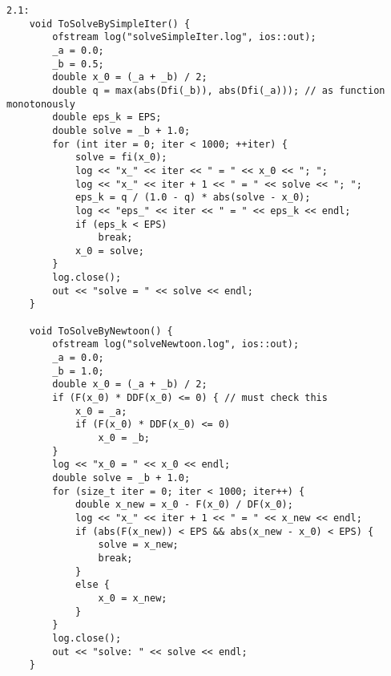 \begin{lstlisting}
2.1:
    void ToSolveBySimpleIter() {
        ofstream log("solveSimpleIter.log", ios::out);
        _a = 0.0;
        _b = 0.5;
        double x_0 = (_a + _b) / 2; 
        double q = max(abs(Dfi(_b)), abs(Dfi(_a))); // as function monotonously
        double eps_k = EPS;
        double solve = _b + 1.0;
        for (int iter = 0; iter < 1000; ++iter) {
            solve = fi(x_0);
            log << "x_" << iter << " = " << x_0 << "; ";
            log << "x_" << iter + 1 << " = " << solve << "; ";
            eps_k = q / (1.0 - q) * abs(solve - x_0);
            log << "eps_" << iter << " = " << eps_k << endl;
            if (eps_k < EPS)
                break;
            x_0 = solve;
        }
        log.close();
        out << "solve = " << solve << endl;
    }

    void ToSolveByNewtoon() {
        ofstream log("solveNewtoon.log", ios::out);
        _a = 0.0;
        _b = 1.0;
        double x_0 = (_a + _b) / 2;
        if (F(x_0) * DDF(x_0) <= 0) { // must check this 
            x_0 = _a;
            if (F(x_0) * DDF(x_0) <= 0)
                x_0 = _b;
        }
        log << "x_0 = " << x_0 << endl;
        double solve = _b + 1.0;
        for (size_t iter = 0; iter < 1000; iter++) {
            double x_new = x_0 - F(x_0) / DF(x_0);
            log << "x_" << iter + 1 << " = " << x_new << endl;
            if (abs(F(x_new)) < EPS && abs(x_new - x_0) < EPS) {
                solve = x_new;
                break;
            }
            else {
                x_0 = x_new;
            }
        }
        log.close();
        out << "solve: " << solve << endl;
    }


\end{lstlisting}
